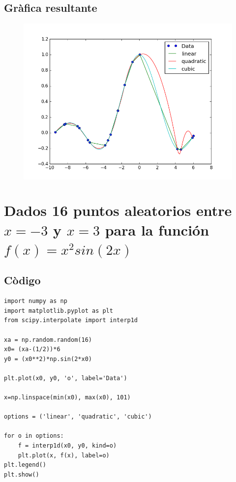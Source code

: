 \documentclass[12pt]{article}
\begin{document}
\subsection{Gràfica resultante}
\begin{figure}[H]
\centering
\includegraphics[scale=.8]{f2}
\end{figure}

\section{Dados 16 puntos aleatorios entre $x=-3$ y $x=3$ para la función $f(x) = x^2 sin(2 x)$}

\subsection{Còdigo}
\begin{verbatim}
import numpy as np
import matplotlib.pyplot as plt
from scipy.interpolate import interp1d

xa = np.random.random(16)
x0= (xa-(1/2))*6
y0 = (x0**2)*np.sin(2*x0)

plt.plot(x0, y0, 'o', label='Data')

x=np.linspace(min(x0), max(x0), 101)

options = ('linear', 'quadratic', 'cubic')

for o in options:
    f = interp1d(x0, y0, kind=o)    
    plt.plot(x, f(x), label=o)     
plt.legend()
plt.show()
\end{verbatim}
\end{document}
